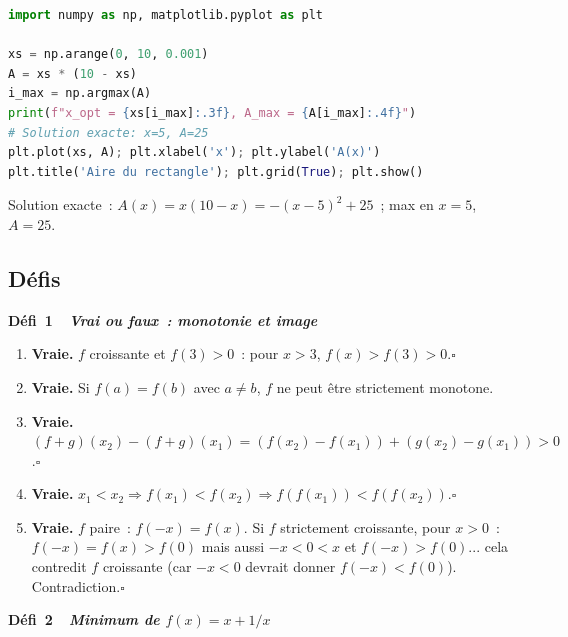 
\begin{lstlisting}[language=Python]
import numpy as np, matplotlib.pyplot as plt

xs = np.arange(0, 10, 0.001)
A = xs * (10 - xs)
i_max = np.argmax(A)
print(f"x_opt = {xs[i_max]:.3f}, A_max = {A[i_max]:.4f}")
# Solution exacte: x=5, A=25
plt.plot(xs, A); plt.xlabel('x'); plt.ylabel('A(x)')
plt.title('Aire du rectangle'); plt.grid(True); plt.show()
\end{lstlisting}
Solution exacte~: $A(x)=x(10-x)=-(x-5)^2+25$~; max en $x=5$, $A=25$.

\subsection*{D\'efis}

\noindent{}
{\color{BO}\bfseries\small D\'efi~1~\textendash\ \textit{Vrai ou faux~: monotonie et image}}
\par\smallskip

\begin{enumerate}
  \item \textbf{Vraie.} $f$ croissante et $f(3)>0$~: pour $x>3$, $f(x)>f(3)>0$.\hfill$\square$
  \item \textbf{Vraie.} Si $f(a)=f(b)$ avec $a\ne b$, $f$ ne peut \^etre strictement monotone.
  \item \textbf{Vraie.} $(f+g)(x_2)-(f+g)(x_1)=(f(x_2)-f(x_1))+(g(x_2)-g(x_1))>0$.\hfill$\square$
  \item \textbf{Vraie.} $x_1<x_2\Rightarrow f(x_1)<f(x_2)\Rightarrow f(f(x_1))<f(f(x_2))$.\hfill$\square$
  \item \textbf{Vraie.} $f$ paire~: $f(-x)=f(x)$. Si $f$ strictement croissante, pour $x>0$~:
        $f(-x)=f(x)>f(0)$ mais aussi $-x<0<x$ et $f(-x)>f(0)$... cela contredit $f$ croissante
        (car $-x<0$ devrait donner $f(-x)<f(0)$). Contradiction.\hfill$\square$
\end{enumerate}

\noindent{}
{\color{BO}\bfseries\small D\'efi~2~\textendash\ \textit{Minimum de $f(x)=x+1/x$}}
\par\smallskip

